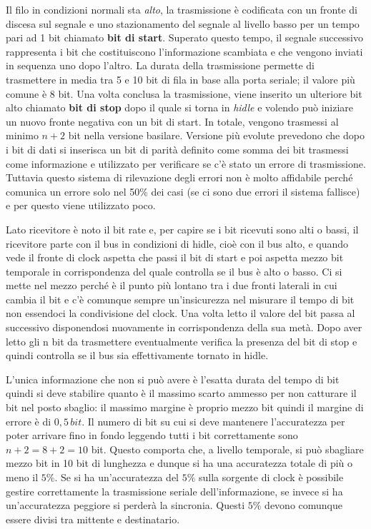 \documentclass[12pt, a4paper]{report}
\begin{document}
Il filo in condizioni normali sta \textit{alto}, la trasmissione è codificata con un fronte di discesa sul segnale e uno stazionamento del segnale al livello basso per un tempo pari ad 1 bit chiamato \textbf{bit di start}. Superato questo tempo, il segnale successivo rappresenta i bit che costituiscono l'informazione scambiata e che vengono inviati in sequenza uno dopo l'altro. La durata della trasmissione permette di trasmettere in media tra 5 e 10 bit di fila in base alla porta seriale; il valore più comune è 8 bit. Una volta conclusa la trasmissione, viene inserito un ulteriore bit alto chiamato \textbf{bit di stop} dopo il quale si torna in \textit{hidle} e volendo può iniziare un nuovo fronte negativa con un bit di start. In totale, vengono trasmessi al minimo $n + 2$ bit nella versione basilare. Versione più evolute prevedono che dopo i bit di dati si inserisca un bit di parità definito come somma dei bit trasmessi come informazione e utilizzato per verificare se c'è stato un errore di trasmissione. Tuttavia questo sistema di rilevazione degli errori non è molto affidabile perché comunica un errore solo nel 50\% dei casi (se ci sono due errori il sistema fallisce) e per questo viene utilizzato poco.

Lato ricevitore è noto il bit rate e, per capire se i bit ricevuti sono alti o bassi, il ricevitore parte con il bus in condizioni di hidle, cioè con il bus alto, e quando vede il fronte di clock aspetta che passi il bit di start e poi aspetta mezzo bit temporale in corrispondenza del quale controlla se il bus è alto o basso. Ci si mette nel mezzo perché è il punto più lontano tra i due fronti laterali in cui cambia il bit e c'è comunque sempre un'insicurezza nel misurare il tempo di bit non essendoci la condivisione del clock. Una volta letto il valore del bit passa al successivo disponendosi nuovamente in corrispondenza della sua metà. Dopo aver letto gli n bit da trasmettere eventualmente verifica la presenza del bit di stop e quindi controlla se il bus sia effettivamente tornato in hidle.

L'unica informazione che non si può avere è l'esatta durata del tempo di bit quindi si deve stabilire quanto è il massimo scarto ammesso per non catturare il bit nel posto sbaglio: il massimo margine è proprio mezzo bit quindi il margine di errore è di $0,5\,\textit{bit}$. Il numero di bit su cui si deve mantenere l'accuratezza per poter arrivare fino in fondo leggendo tutti i bit correttamente sono $n + 2 = 8 + 2 = 10$ bit. Questo comporta che, a livello temporale, si può sbagliare mezzo bit in 10 bit di lunghezza e dunque si ha una accuratezza totale di più o meno il $5\%$. Se si ha un'accuratezza del $5\%$ sulla sorgente di clock è possibile gestire correttamente la trasmissione seriale dell'informazione, se invece si ha un'accuratezza peggiore si perderà la sincronia. Questi $5\%$ devono comunque essere divisi tra mittente e destinatario.
\end{document}
